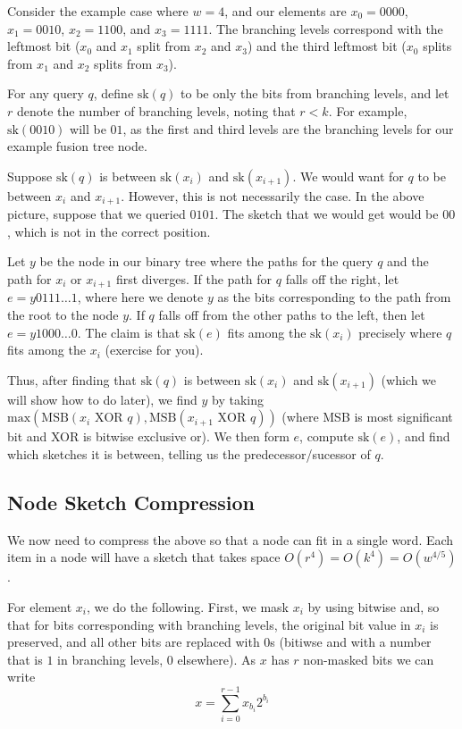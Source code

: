 \documentclass[11pt]{article}
\begin{document}
Consider the example case where $w=4$, and our elements are $x_0=0000$, $x_1 = 0010$, $x_2 = 1100$, and $x_3 = 1111$. The branching levels correspond with the leftmost bit ($x_0$ and $x_1$ split from $x_2$ and $x_3$) and the third leftmost bit ($x_0$ splits from $x_1$ and $x_2$ splits from $x_3$).

For any query $q$, define $\text{sk}(q)$ to be only the bits from branching levels, and let $r$ denote the number of branching levels, noting that $r<k$. For example, $\text{sk}(0010)$ will be $01$, as the first and third levels are the branching levels for our example fusion tree node.

Suppose $\text{sk}(q)$ is between $\text{sk}(x_i)$ and $\text{sk}(x_{i+1})$. We would want for $q$ to be between $x_i$ and $x_{i+1}$. However, this is not necessarily the case. In the above picture, suppose that we queried $0101$. The sketch that we would get would be $00$, which is not in the correct position.

Let $y$ be the node in our binary tree where the paths for the query $q$ and the path for $x_i$ or $x_{i+1}$ first diverges. If the path for $q$ falls off the right, let $e=y0111\ldots 1$, where here we denote $y$ as the bits corresponding to the path from the root to the node $y$. If $q$ falls off from the other paths to the left, then let $e=y1000\ldots 0$. The claim is that $\text{sk}(e)$ fits among the $\text{sk}(x_i)$ precisely where $q$ fits among the $x_i$ (exercise for you).

Thus, after finding that $\text{sk}(q)$ is between $\text{sk}(x_i)$ and $\text{sk}(x_{i+1})$ (which we will show how to do later), we find $y$ by taking $\text{max}(\text{MSB}(x_i\text{ XOR } q), \text{MSB}(x_{i+1}\text{ XOR }q))$ (where MSB is most significant bit and XOR is bitwise exclusive or). We then form $e$, compute $\text{sk}(e)$, and find which sketches it is between, telling us the predecessor/sucessor of $q$.

\subsection{Node Sketch Compression}
We now need to compress the above so that a node can fit in a single word. Each item in a node will have a sketch that takes space $O(r^4) = O(k^4) = O(w^{4/5})$.

For element $x_i$, we do the following. First, we mask $x_i$ by using bitwise and, so that for bits corresponding with branching levels, the original bit value in $x_i$ is preserved, and all other bits are replaced with $0$s (bitiwse and with a number that is $1$ in branching levels, $0$ elsewhere). As $x$ has $r$ non-masked bits we can write $$x=\sum_{i=0}^{r-1} x_{b_i} 2^{b_i}$$
\end{document}
